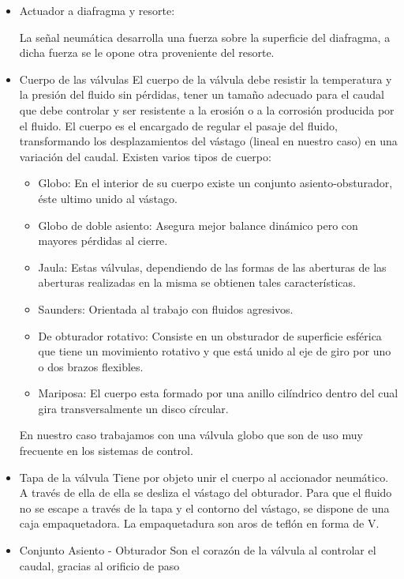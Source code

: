 \begin{itemize}
  \item Actuador a diafragma y resorte:
  
  La señal neumática desarrolla una fuerza sobre la superficie del diafragma, a 
  dicha fuerza se le opone otra proveniente del resorte.
  
  \item Cuerpo de las válvulas
  El cuerpo de la válvula debe resistir la temperatura y la presión del fluido
  sin pérdidas, tener un tamaño adecuado para el caudal que debe controlar y ser
  resistente a la erosión o a la corrosión producida por el fluido.
  El cuerpo es el encargado de regular el pasaje del fluido, transformando los
  desplazamientos del vástago (lineal en nuestro caso) en una variación 
  del caudal.
  Existen varios tipos de cuerpo:
  \begin{itemize}
      \item Globo:
      En el interior de su cuerpo existe un conjunto asiento-obsturador, 
      éste ultimo unido al vástago.
      \item Globo de doble asiento:
      Asegura mejor balance dinámico pero con mayores pérdidas al cierre.
      \item Jaula:
      Estas válvulas, dependiendo de las formas de las aberturas de las aberturas
      realizadas en la misma se obtienen tales características.
      \item Saunders:
      Orientada al trabajo con fluidos agresivos.
      \item De obturador rotativo:
      Consiste en un obsturador de superficie esférica que tiene un movimiento
      rotativo y que está unido al eje de giro por uno o dos brazos flexibles.
      \item Mariposa:
      El cuerpo esta formado por una anillo cilíndrico dentro del cual gira
      transversalmente un disco círcular. 
    \end{itemize}
  En nuestro caso trabajamos con una válvula globo que son de uso muy frecuente 
  en los sistemas de control.
  \item Tapa de la válvula
  Tiene por objeto unir el cuerpo al accionador neumático. A través de ella de ella
  se desliza el vástago del obturador.
  Para que el fluido no se escape a través de la tapa y el contorno del vástago, 
  se dispone de una caja empaquetadora. La empaquetadura son aros de teflón en 
  forma de V.
  \item Conjunto Asiento - Obturador
  Son el corazón de la válvula al controlar el caudal, gracias al orificio de paso

\end{itemize}
